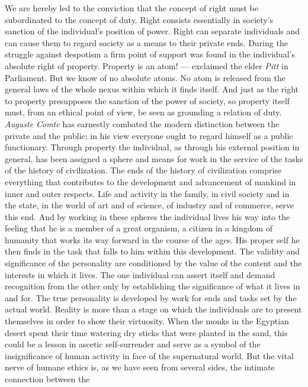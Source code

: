 \documentclass[12pt,a4paper,openany]{book}
\newcommand{\opage}[1]{\marginnote{\footnotesize\textit{[#1]}}}
\begin{document}
We are hereby led to the conviction that the concept of right must be
subordinated to the concept of duty. Right consists essentially in
society's sanction of the individual's position of power. Right can
separate individuals and can cause them to regard society as a means to
their private ends. During the struggle against despotism a firm point of
support was found in the individual's absolute right of property. Property
is an atom! --- exclaimed the elder \emph{Pitt} in Parliament. But we know of no
absolute atoms. No atom is released from the general laws of the whole
nexus within which it finds itself. And just as the right to property
presupposes the sanction of the power of society, so property itself must,
from an ethical point of view, be seen as grounding a relation of duty.
\emph{Auguste Comte} has earnestly combated the modern distinction between
\opage{101}the private and the public; in his view everyone ought to regard
himself as a public functionary. Through property the individual, as
through his external position in general, has been assigned a sphere and
means for work in the service of the tasks of the history of civilization.
The ends of the history of civilization comprise everything that
contributes to the development and advancement of mankind in inner and
outer respects. Life and activity in the family, in civil society and in
the state, in the world of art and of science, of industry and of
commerce, serve this end. And by working in these spheres the individual
lives his way into the feeling that he is a member of a great organism, a
citizen in a kingdom of humanity that works its way forward in the course
of the ages. His proper self he then finds in the task that falls to him
within this development. The validity and significance of the personality
are conditioned by the value of the content and the interests in which it
lives. The one individual can assert itself and demand recognition from
the other only by establishing the significance of what it lives in and
for. The true personality is developed by work for ends and tasks set by
the actual world. Reality is more than a stage on which the individuals
are to present themselves in order to show their virtuosity. When the
monks in the Egyptian desert spent their time watering dry sticks that
were planted in the sand, this could be a lesson in ascetic self-surrender
and serve as a symbol of the insignificance of human activity in face of
the \opage{102}supernatural world. But the vital nerve of humane ethics is,
as we have seen from several sides, the intimate connection between the
\end{document}
